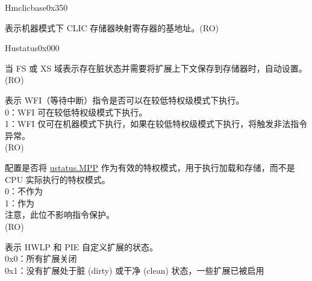 \begin{register}{H}{mclicbase}{0x350}\label{regdesc:MCLICBASE_REG}
%
\regnewline%
\begin{regdesc}\begin{reglist}
\label{fielddesc:MCLICBASE}\item [MCLICBASE] 表示机器模式下 CLIC 存储器映射寄存器的基地址。(RO)
\end{reglist}\end{regdesc}
\end{register}

\begin{register}{H}{ustatus}{0x000}\label{regdesc:USTATUS}
%
%
%
%
%
%
%
%
%
%
%
%
%
%
%
\regnewline%
\begin{regdesc}\begin{reglist}
\label{fielddesc:USTATUS_SD}\item [SD] 当 FS 或 XS 域表示存在脏状态并需要将扩展上下文保存到存储器时，自动设置。(RO)
\label{fielddesc:USTATUSTW}\item [TW] 表示 WFI（等待中断）指令是否可以在较低特权级模式下执行。\\
0：WFI 可在较低特权级模式下执行。\\
1：WFI 仅可在机器模式下执行，如果在较低特权级模式下执行，将触发非法指令异常。\\
(RO)
\label{fielddesc:USTATUS_MPRV}\item [MPRV] 配置是否将 \hyperref[fielddesc:USTATUSMPP]{ustatus.MPP} 作为有效的特权模式，用于执行加载和存储，而不是 CPU 实际执行的特权模式。\\
0：不作为\\
1：作为\\
注意，此位不影响指令保护。\\
(RO)
\label{fielddesc:USTATUS_XS}\item [XS] 表示 HWLP 和 PIE 自定义扩展的状态。\\
0x0：所有扩展关闭\\
0x1：没有扩展处于脏 (dirty) 或干净 (clean) 状态，一些扩展已被启用\\

\end{reglist}
\end{regdesc}
\end{register}
